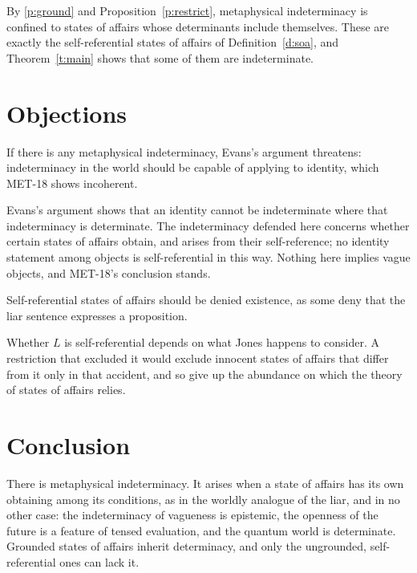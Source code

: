 \documentclass{situationist-preprint}
\begin{document}
By \ref{p:ground} and Proposition~\ref{p:restrict}, metaphysical indeterminacy is confined to states of affairs whose determinants include themselves. These are exactly the self-referential states of affairs of Definition~\ref{d:soa}, and Theorem~\ref{t:main} shows that some of them are indeterminate.

\section{Objections}

\begin{objection}
If there is any metaphysical indeterminacy, Evans's argument \citep{Evans1978} threatens: indeterminacy in the world should be capable of applying to identity, which MET-18 shows incoherent.
\end{objection}

\begin{reply}
Evans's argument shows that an identity cannot be indeterminate where that indeterminacy is determinate. The indeterminacy defended here concerns whether certain states of affairs obtain, and arises from their self-reference; no identity statement among objects is self-referential in this way. Nothing here implies vague objects, and MET-18's conclusion stands.
\end{reply}

\begin{objection}
Self-referential states of affairs should be denied existence, as some deny that the liar sentence expresses a proposition.
\end{objection}

\begin{reply}
Whether $L$ is self-referential depends on what Jones happens to consider. A restriction that excluded it would exclude innocent states of affairs that differ from it only in that accident, and so give up the abundance on which the theory of states of affairs relies.
\end{reply}

\section{Conclusion}

There is metaphysical indeterminacy. It arises when a state of affairs has its own obtaining among its conditions, as in the worldly analogue of the liar, and in no other case: the indeterminacy of vagueness is epistemic, the openness of the future is a feature of tensed evaluation, and the quantum world is determinate. Grounded states of affairs inherit determinacy, and only the ungrounded, self-referential ones can lack it.
\end{document}
